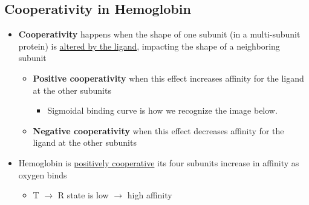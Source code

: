 \documentclass[10pt]{article}
\begin{document}
\subsection*{Cooperativity in Hemoglobin}
\begin{itemize}
    \item \textbf{Cooperativity} happens when the shape of one subunit (in a multi-subunit protein) is \underline{altered by the ligand}, impacting the shape of a neighboring subunit
    \begin{itemize}
        \item \textbf{Positive cooperativity} when this effect increases affinity for the ligand at the other subunits
        \begin{itemize}
            \item Sigmoidal binding curve is how we recognize the image below.
        \end{itemize}
        \item \textbf{Negative cooperativity} when this effect decreases affinity for the ligand at the other subunits
    \end{itemize}
    \item Hemoglobin is \underline{positively cooperative} its four subunits increase in affinity as oxygen binds
    \begin{itemize}
        \item T $\rightarrow$ R state is low $\rightarrow$ high affinity
    \end{itemize}
\end{itemize}
\end{document}
